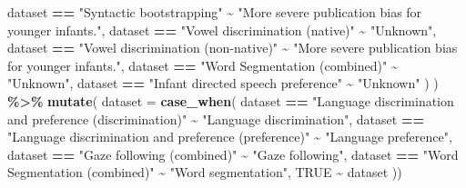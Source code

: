 \documentclass[
]{article}
\newenvironment{Shaded}{\begin{snugshade}}{\end{snugshade}}
\newcommand{\AttributeTok}[1]{\textcolor[rgb]{0.13,0.29,0.53}{#1}}
\newcommand{\ConstantTok}[1]{\textcolor[rgb]{0.56,0.35,0.01}{#1}}
\newcommand{\FunctionTok}[1]{\textcolor[rgb]{0.13,0.29,0.53}{\textbf{#1}}}
\newcommand{\NormalTok}[1]{#1}
\newcommand{\SpecialCharTok}[1]{\textcolor[rgb]{0.81,0.36,0.00}{\textbf{#1}}}
\newcommand{\StringTok}[1]{\textcolor[rgb]{0.31,0.60,0.02}{#1}}
\begin{document}
\begin{Shaded}
\begin{Highlighting}[]
\NormalTok{      dataset }\SpecialCharTok{==} \StringTok{"Syntactic bootstrapping"} \SpecialCharTok{\textasciitilde{}} \StringTok{"More severe publication bias for younger infants."}\NormalTok{, }
\NormalTok{      dataset }\SpecialCharTok{==} \StringTok{"Vowel discrimination (native)"} \SpecialCharTok{\textasciitilde{}} \StringTok{"Unknown"}\NormalTok{, }
\NormalTok{      dataset }\SpecialCharTok{==} \StringTok{"Vowel discrimination (non{-}native)"} \SpecialCharTok{\textasciitilde{}} \StringTok{"More severe publication bias for younger infants."}\NormalTok{,}
\NormalTok{      dataset }\SpecialCharTok{==} \StringTok{"Word Segmentation (combined)"} \SpecialCharTok{\textasciitilde{}} \StringTok{"Unknown"}\NormalTok{, }
\NormalTok{      dataset }\SpecialCharTok{==} \StringTok{"Infant directed speech preference"} \SpecialCharTok{\textasciitilde{}} \StringTok{"Unknown"}
\NormalTok{    )}
\NormalTok{  ) }\SpecialCharTok{\%\textgreater{}\%} 
  \FunctionTok{mutate}\NormalTok{(}
     \AttributeTok{dataset =} \FunctionTok{case\_when}\NormalTok{(}
\NormalTok{      dataset }\SpecialCharTok{==} \StringTok{"Language discrimination and preference (discrimination)"} \SpecialCharTok{\textasciitilde{}} \StringTok{"Language discrimination"}\NormalTok{, }
\NormalTok{      dataset }\SpecialCharTok{==} \StringTok{"Language discrimination and preference (preference)"} \SpecialCharTok{\textasciitilde{}} \StringTok{"Language preference"}\NormalTok{,}
\NormalTok{      dataset }\SpecialCharTok{==} \StringTok{"Gaze following (combined)"} \SpecialCharTok{\textasciitilde{}} \StringTok{"Gaze following"}\NormalTok{, }
\NormalTok{      dataset }\SpecialCharTok{==} \StringTok{"Word Segmentation (combined)"} \SpecialCharTok{\textasciitilde{}} \StringTok{"Word segmentation"}\NormalTok{, }
      \ConstantTok{TRUE} \SpecialCharTok{\textasciitilde{}}\NormalTok{ dataset}
\NormalTok{  ))}
  

\end{Highlighting}
\end{Shaded}
\end{document}
